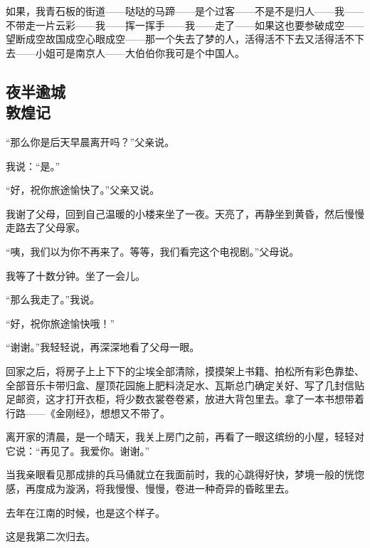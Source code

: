 \par 如果，我青石板的街道——哒哒的马蹄——是个过客——不是不是归人——我——不带走一片云彩——我——挥一挥手——我——走了——如果这也要参破成空——望断成空故国成空心眼成空——那一个失去了梦的人，活得活不下去又活得活不下去——小姐可是南京人——大伯伯你我可是个中国人。


\subsection{夜半逾城\\\small{敦煌记}}


\par “那么你是后天早晨离开吗？”父亲说。
\par 我说：“是。”
\par “好，祝你旅途愉快了。”父亲又说。
\par 我谢了父母，回到自己温暖的小楼来坐了一夜。天亮了，再静坐到黄昏，然后慢慢走路去了父母家。
\par “咦，我们以为你不再来了。等等，我们看完这个电视剧。”父母说。
\par 我等了十数分钟。坐了一会儿。
\par “那么我走了。”我说。
\par “好，祝你旅途愉快哦！”
\par “谢谢。”我轻轻说，再深深地看了父母一眼。
\par 回家之后，将房子上上下下的尘埃全部清除，摸摸架上书籍、拍松所有彩色靠垫、全部音乐卡带归盒、屋顶花园施上肥料浇足水、瓦斯总门确定关好、写了几封信贴足邮资，这才打开衣柜，将少数衣裳卷卷紧，放进大背包里去。拿了一本书想带着行路——《金刚经》，想想又不带了。
\par 离开家的清晨，是一个晴天，我关上房门之前，再看了一眼这缤纷的小屋，轻轻对它说：“再见了。我爱你。谢谢。”
\par 
\par 当我亲眼看见那成排的兵马俑就立在我面前时，我的心跳得好快，梦境一般的恍惚感，再度成为漩涡，将我慢慢、慢慢，卷进一种奇异的昏眩里去。
\par 去年在江南的时候，也是这个样子。
\par 这是我第二次归去。
\par
